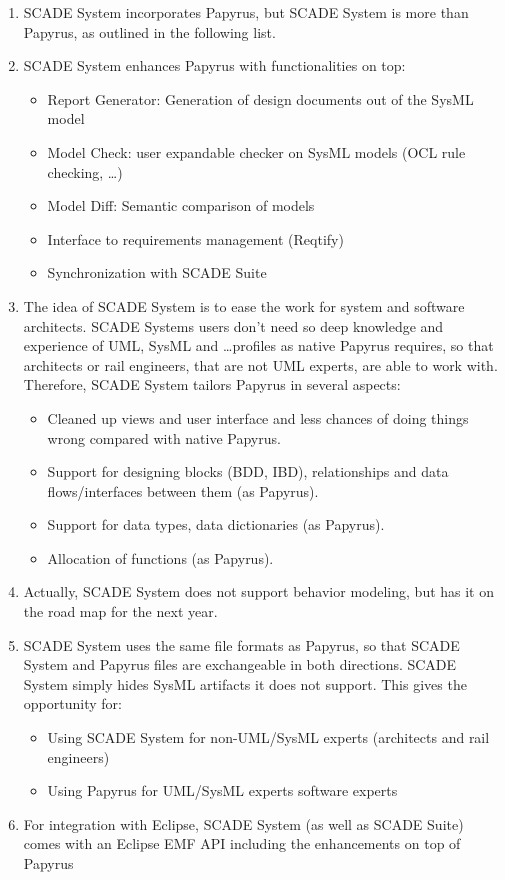 \begin{enumerate}
	\item SCADE System incorporates Papyrus, but SCADE System is more than Papyrus, as outlined in the following list. 
	\item SCADE System enhances Papyrus with functionalities on top: 
	
	\begin{itemize}
		\item Report Generator: Generation of design documents out of the SysML model
		\item Model Check: user expandable checker on SysML models (OCL rule checking, …)
		\item Model Diff: Semantic comparison of models
		\item Interface to requirements management (Reqtify)
		\item Synchronization with SCADE Suite
	\end{itemize}
	
	\item The idea of SCADE System is to ease the work for system and software architects.  SCADE Systems users don’t need so deep knowledge and experience of UML, SysML and …profiles as native Papyrus requires, so that architects or rail engineers, that are not UML experts, are able to work with. Therefore, SCADE System tailors Papyrus in several aspects:
	
	\begin{itemize}
		\item Cleaned up views and user interface and less chances of doing things wrong compared with native Papyrus.
		\item Support for designing blocks (BDD, IBD), relationships and data flows/interfaces between them (as Papyrus).
		\item Support for data types, data dictionaries (as Papyrus).
		\item Allocation of functions (as Papyrus).
	\end{itemize}
	
	\item Actually, SCADE System does not support behavior modeling, but has it on the road map for the next year.
	\item SCADE System uses the same file formats as Papyrus, so that SCADE System and Papyrus files are exchangeable in both directions. SCADE System simply hides SysML artifacts it does not support. This gives the opportunity for:
	
	\begin{itemize}
		\item Using SCADE System for non-UML/SysML experts (architects and rail engineers)
		\item Using Papyrus for UML/SysML experts software experts
	\end{itemize}
	
	\item For integration with Eclipse, SCADE System (as well as SCADE Suite) comes with an Eclipse EMF API including the enhancements on top of Papyrus
\end{enumerate}

